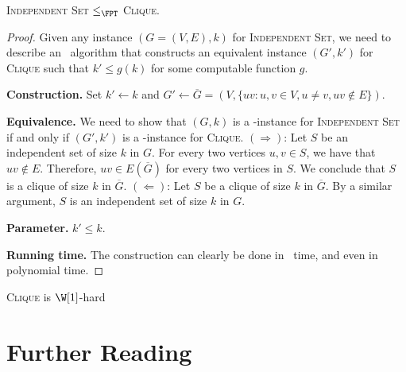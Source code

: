 \begin{frame}
	
	\begin{lemma}
		\textsc{Independent Set} $\le_{\FPT}$ \textsc{Clique}.
	\end{lemma}
	\begin{proof}
		Given any instance $(G=(V,E),k)$ for \textsc{Independent Set}, we need to describe an \FPT\ algorithm that constructs an equivalent instance $(G',k')$ for \textsc{Clique} such that $k'\le g(k)$ for some computable function $g$.
		
		\pause
		\noindent
		\textbf{Construction.}
		Set $k' \leftarrow k$ and $G' \leftarrow %
		\overline{G} = (V,\{uv : u,v \in V, u\ne v, uv\notin E\})$.
		
		\pause
		\noindent
		\textbf{Equivalence.}
		We need to show that $(G,k)$ is a \Yes-instance for \textsc{Independent Set} if and only if $(G',k')$ is a \Yes-instance for \textsc{Clique}.\newline
		\pause
		$(\Rightarrow)$: Let $S$ be an independent set of size $k$ in $G$. For every two vertices $u,v\in S$, we have that $uv \notin E$. Therefore, $uv\in E(\overline{G})$ for every two vertices in $S$. We conclude that $S$ is a clique of size $k$ in $\overline{G}$.\newline
		\pause
		$(\Leftarrow)$: Let $S$ be a clique of size $k$ in $\overline{G}$. By a similar argument, $S$ is an independent set of size $k$ in $G$.
		
		\pause
		\noindent
		\textbf{Parameter.}
		$k' \le k$.
		
		\pause
		\noindent
		\textbf{Running time.}
		The construction can clearly be done in \FPT\ time, and even in polynomial time.
	\end{proof}
	
\end{frame}

\begin{frame}

	\begin{corollary}
		\textsc{Clique} is $\W[1]$-hard
	\end{corollary}	

\end{frame}


\section{Further Reading}

